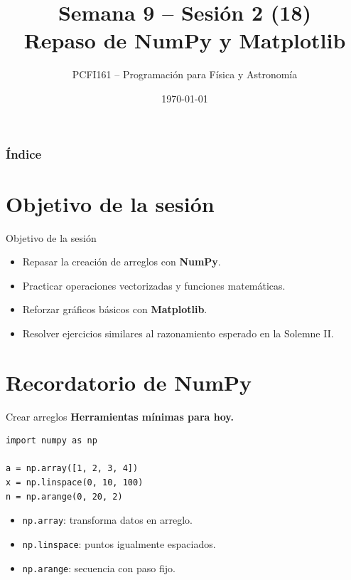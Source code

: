 \documentclass[10pt]{beamer}
\title{Semana 9 – Sesión 2 (18)\\Repaso de NumPy y Matplotlib}
\author{PCFI161 – Programación para Física y Astronomía}
\date{\today}
\begin{document}
\myfront{}

\begin{frame}\titlepage\end{frame}

\begin{frame}\frametitle{Índice}\tableofcontents\end{frame}

\section{Objetivo de la sesión}
\begin{frame}{Objetivo de la sesión}
\begin{itemize}
  \item Repasar la creación de arreglos con \textbf{NumPy}.
  \item Practicar operaciones vectorizadas y funciones matemáticas.
  \item Reforzar gráficos básicos con \textbf{Matplotlib}.
  \item Resolver ejercicios similares al razonamiento esperado en la Solemne II.
\end{itemize}
\end{frame}

\section{Recordatorio de NumPy}
\begin{frame}[fragile]{Crear arreglos}
\textbf{Herramientas mínimas para hoy.}
\begin{verbatim}
import numpy as np

a = np.array([1, 2, 3, 4])
x = np.linspace(0, 10, 100)
n = np.arange(0, 20, 2)
\end{verbatim}
\begin{itemize}
  \item \texttt{np.array}: transforma datos en arreglo.
  \item \texttt{np.linspace}: puntos igualmente espaciados.
  \item \texttt{np.arange}: secuencia con paso fijo.
\end{itemize}
\end{frame}
\end{document}
